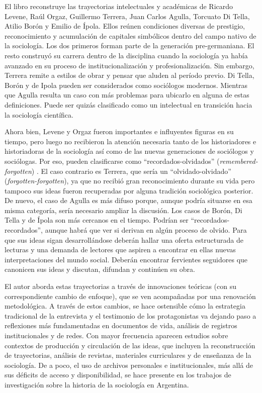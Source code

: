 {El libro reconstruye las trayectorias intelectuales y académicas de Ricardo Levene, Raúl Orgaz, Guillermo Terrera, Juan Carlos Agulla, Torcuato Di Tella, Atilio Borón y Emilio de Ípola. Ellos reúnen condiciones diversas de prestigio, reconocimiento y acumulación de capitales simbólicos dentro del campo nativo de la sociología. Los dos primeros forman parte de la generación pre-germaniana. El resto construyó su carrera dentro de la disciplina cuando la sociología ya había avanzado en su proceso de institucionalización y profesionalización. Sin embargo, Terrera remite a estilos de obrar y pensar que aluden al período previo. Di Tella, Borón y de Ipola pueden ser considerados como sociólogos modernos. Mientras que Agulla resulta un caso con más problemas para ubicarlo en alguna de estas definiciones. Puede ser quizás clasificado como un intelectual en transición hacia la sociología científica.

Ahora bien, Levene y Orgaz fueron importantes e influyentes figuras en su tiempo, pero luego no recibieron la atención necesaria tanto de los historiadores e historiadoras de la sociología así como de las nuevas generaciones de sociólogos y sociólogas. Por eso, pueden clasificarse como \enquote{recordados-olvidados} (\emph{remembered-forgotten}) \parencite{280-BARGHEER2024,1706-MCGAIL2021}. El caso contrario es Terrera, que sería un \enquote{olvidado-olvidado} (\emph{forgotten-forgotten}), ya que no recibió gran reconocimiento durante su vida pero tampoco sus ideas fueron recuperadas por alguna tradición sociológica posterior. De nuevo, el caso de Agulla es más difuso porque, aunque podría situarse en esa misma categoría, sería necesario ampliar la discusión. Los casos de Borón, Di Tella y de Ípola son más cercanos en el tiempo. Podrían ser \enquote{recordados-recordados}, aunque habrá que ver si derivan en algún proceso de olvido. Para que sus ideas sigan desarrollándose deberán hallar una oferta estructurada de lecturas y una demanda de lectores que aspiren a encontrar en ellas nuevas interpretaciones del mundo social. Deberán encontrar fervientes seguidores que canonicen sus ideas y discutan, difundan y continúen su obra.

El autor aborda estas trayectorias a través de innovaciones teóricas (con su correspondiente cambio de enfoque), que se ven acompañadas por una renovación metodológica. A través de estos cambios, se hace ostensible cómo la estrategia tradicional de la entrevista y el testimonio de los protagonistas va dejando paso a reflexiones más fundamentadas en documentos de vida, análisis de registros institucionales y de redes. Con mayor frecuencia aparecen estudios sobre contextos de producción y circulación de las ideas, que incluyen la reconstrucción de trayectorias, análisis de revistas, materiales curriculares y de enseñanza de la sociología. De a poco, el uso de archivos personales e institucionales, más allá de sus déficits de acceso y disponibilidad, se hace presente en los trabajos de investigación sobre la historia de la sociología en Argentina.

}
